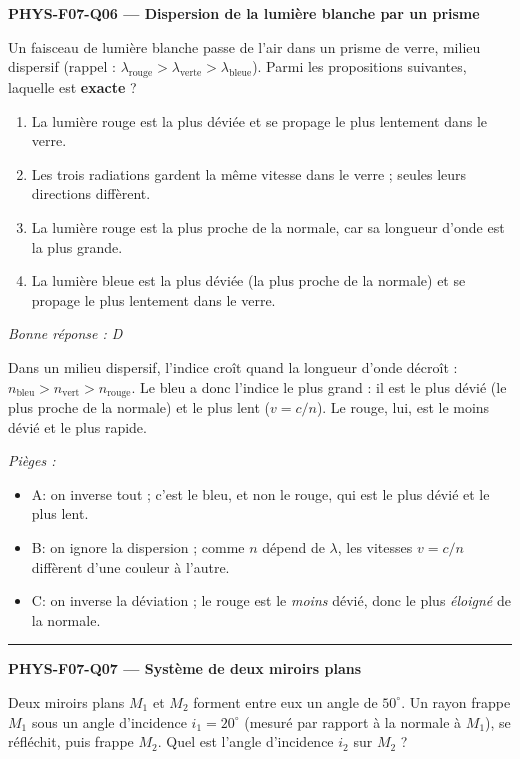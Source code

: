 \documentclass[11pt,a4paper]{article}
\begin{document}
\noindent\textbf{PHYS-F07-Q06 --- Dispersion de la lumière blanche par un prisme}\par
Un faisceau de lumière blanche passe de l'air dans un prisme de verre, milieu dispersif (rappel : $\lambda_{\text{rouge}}>\lambda_{\text{verte}}>\lambda_{\text{bleue}}$). Parmi les propositions suivantes, laquelle est \textbf{exacte} ?
\begin{enumerate}[label=\Alph*)]
\item La lumière rouge est la plus déviée et se propage le plus lentement dans le verre.
\item Les trois radiations gardent la même vitesse dans le verre ; seules leurs directions diffèrent.
\item La lumière rouge est la plus proche de la normale, car sa longueur d'onde est la plus grande.
\item La lumière bleue est la plus déviée (la plus proche de la normale) et se propage le plus lentement dans le verre.
\end{enumerate}
\textit{Bonne réponse : D}\par
Dans un milieu dispersif, l'indice croît quand la longueur d'onde décroît : $n_{\text{bleu}}>n_{\text{vert}}>n_{\text{rouge}}$. Le bleu a donc l'indice le plus grand : il est le plus dévié (le plus proche de la normale) et le plus lent ($v=c/n$). Le rouge, lui, est le moins dévié et le plus rapide.\par
\textit{Pièges :}
\begin{itemize}
\item A: on inverse tout ; c'est le bleu, et non le rouge, qui est le plus dévié et le plus lent.
\item B: on ignore la dispersion ; comme $n$ dépend de $\lambda$, les vitesses $v=c/n$ diffèrent d'une couleur à l'autre.
\item C: on inverse la déviation ; le rouge est le \emph{moins} dévié, donc le plus \emph{éloigné} de la normale.
\end{itemize}
\vspace{8pt}\hrule\vspace{8pt}

\noindent\textbf{PHYS-F07-Q07 --- Système de deux miroirs plans}\par
Deux miroirs plans $M_1$ et $M_2$ forment entre eux un angle de $50^\circ$. Un rayon frappe $M_1$ sous un angle d'incidence $i_1=20^\circ$ (mesuré par rapport à la normale à $M_1$), se réfléchit, puis frappe $M_2$. Quel est l'angle d'incidence $i_2$ sur $M_2$ ?
\end{document}
